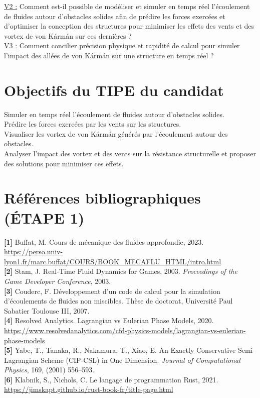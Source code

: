 \documentclass{article}
\begin{document}
\underline{\color{green!70!black}V2 :} Comment est-il possible de modéliser et simuler en temps réel l'écoulement de fluides autour 
d'obstacles solides   afin de prédire les forces exercées et d'optimiser la conception des structures pour minimiser
les effets des vents et des vortex de von Kármán sur ces dernières ?\\

\underline{\color{green!70!black}V3 :} Comment concilier précision physique et rapidité de calcul pour simuler l'impact des allées de 
von Kármán sur une structure en temps réel ?\\



\section*{Objectifs du TIPE du candidat}

Simuler en temps réel l'écoulement de fluides autour d'obstacles solides.\\

Prédire les forces exercées par les vents sur les structures.\\

Visualiser les vortex de von Kármán générés par l'écoulement autour des obstacles.\\

Analyser l'impact des vortex et des vents sur la résistance structurelle et proposer des solutions pour minimiser ces effets.\\





\section*{Références bibliographiques (ÉTAPE 1)}

\textbf{[1]} Buffat, M. Cours de mécanique des fluides approfondie, 2023. \url{https://perso.univ-lyon1.fr/marc.buffat/COURS/BOOK_MECAFLU_HTML/intro.html}\\

\textbf{[2]} Stam, J. Real-Time Fluid Dynamics for Games, 2003. \textit{Proceedings of the Game Developer Conference}, 2003.\\

\textbf{[3]} Couderc, F. Développement d'un code de calcul pour la simulation d'écoulements de fluides non miscibles. Thèse de doctorat, Université Paul Sabatier Toulouse III, 2007.\\

\textbf{[4]} Resolved Analytics. Lagrangian vs Eulerian Phase Models, 2020. \url{https://www.resolvedanalytics.com/cfd-physics-models/lagrangian-vs-eulerian-phase-models}\\

\textbf{[5]} Yabe, T., Tanaka, R., Nakamura, T., Xiao, E. An Exactly Conservative Semi-Lagrangian Scheme (CIP-CSL) in One Dimension. \textit{Journal of Computational Physics}, 169, (2001) 556--593.\\

\textbf{[6]} Klabnik, S., Nichols, C. Le langage de programmation Rust, 2021. \url{https://jimskapt.github.io/rust-book-fr/title-page.html}\\
\end{document}
